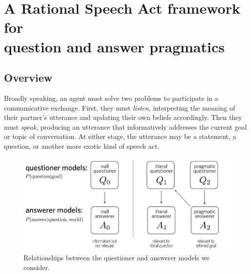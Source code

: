 \documentclass[11pt, floatsintext]{apa6}
\begin{document}
\section{A Rational Speech Act framework for \\ question and answer pragmatics}

\subsection{Overview}

Broadly speaking, an agent must solve two problems to participate in a communicative exchange. 
First, they must \emph{listen}, interpreting the meaning of their partner's utterance and updating their own beliefs accordingly. 
Then they must \emph{speak}, producing an utterance that informatively addresses the current goal or topic of conversation. 
At either stage, the utterance may be a statement, a question, or another more exotic kind of speech act. 

\begin{figure}[t]
\begin{center}
\includegraphics[scale = .5]{models.pdf}
\end{center}
\caption{Relationships between the questioner and answerer models we consider.}
\label{fig:models}
\end{figure}
\end{document}
